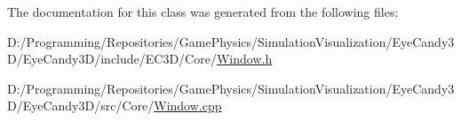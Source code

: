 The documentation for this class was generated from the following files\+:\begin{DoxyCompactItemize}
\item 
D\+:/\+Programming/\+Repositories/\+Game\+Physics/\+Simulation\+Visualization/\+Eye\+Candy3\+D/\+Eye\+Candy3\+D/include/\+E\+C3\+D/\+Core/\mbox{\hyperlink{_window_8h}{Window.\+h}}\item 
D\+:/\+Programming/\+Repositories/\+Game\+Physics/\+Simulation\+Visualization/\+Eye\+Candy3\+D/\+Eye\+Candy3\+D/src/\+Core/\mbox{\hyperlink{_window_8cpp}{Window.\+cpp}}\end{DoxyCompactItemize}
